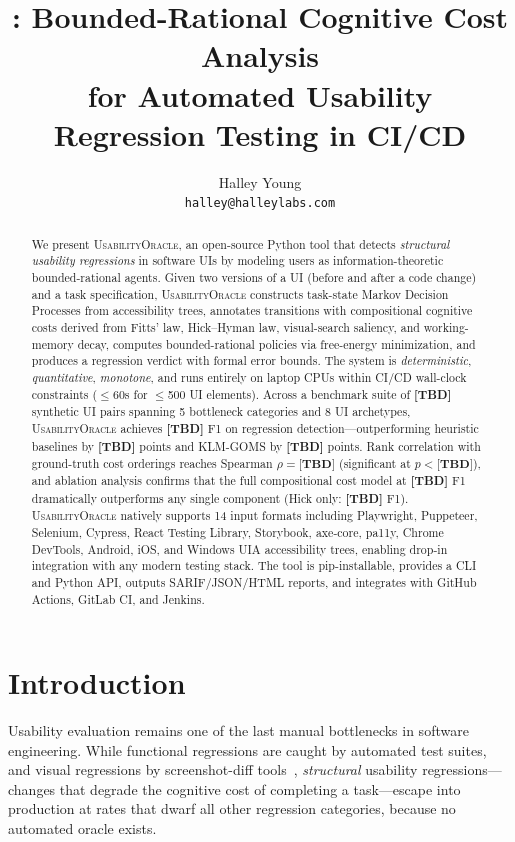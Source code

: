 \documentclass[11pt,twocolumn]{article}
\title{%
  \tool{}: Bounded-Rational Cognitive Cost Analysis\\
  for Automated Usability Regression Testing in CI/CD
}
\author{
  Halley Young \\
  \texttt{halley@halleylabs.com}
}
\date{}
\theoremstyle{definition}
\newcommand{\tool}{\textsc{UsabilityOracle}}
\begin{document}
\maketitle

\begin{abstract}
We present \tool{}, an open-source Python tool that detects \emph{structural usability regressions} in software UIs by modeling users as information-theoretic bounded-rational agents.
Given two versions of a UI (before and after a code change) and a task specification, \tool{} constructs task-state Markov Decision Processes from accessibility trees, annotates transitions with compositional cognitive costs derived from Fitts' law, Hick--Hyman law, visual-search saliency, and working-memory decay, computes bounded-rational policies via free-energy minimization, and produces a regression verdict with formal error bounds.
The system is \emph{deterministic}, \emph{quantitative}, \emph{monotone}, and runs entirely on laptop CPUs within CI/CD wall-clock constraints ($\leq$60s for $\leq$500 UI elements).
Across a benchmark suite of \textbf{[TBD]} synthetic UI pairs spanning 5 bottleneck categories and 8 UI archetypes, \tool{} achieves \textbf{[TBD]} F1 on regression detection---outperforming heuristic baselines by \textbf{[TBD]} points and KLM-GOMS by \textbf{[TBD]} points.
Rank correlation with ground-truth cost orderings reaches Spearman $\rho = \textbf{[TBD]}$ (significant at $p < \textbf{[TBD]}$), and ablation analysis confirms that the full compositional cost model at \textbf{[TBD]} F1 dramatically outperforms any single component (Hick only: \textbf{[TBD]} F1).
\tool{} natively supports 14 input formats including Playwright, Puppeteer, Selenium, Cypress, React Testing Library, Storybook, axe-core, pa11y, Chrome DevTools, Android, iOS, and Windows UIA accessibility trees, enabling drop-in integration with any modern testing stack.
The tool is pip-installable, provides a CLI and Python API, outputs SARIF/JSON/HTML reports, and integrates with GitHub Actions, GitLab CI, and Jenkins.
\end{abstract}

\section{Introduction}
\label{sec:intro}

Usability evaluation remains one of the last manual bottlenecks in software engineering.
While functional regressions are caught by automated test suites, and visual regressions by screenshot-diff tools~\citep{chromatic2023,percy2023}, \emph{structural} usability regressions---changes that degrade the cognitive cost of completing a task---escape into production at rates that dwarf all other regression categories, because no automated oracle exists.
\end{document}
